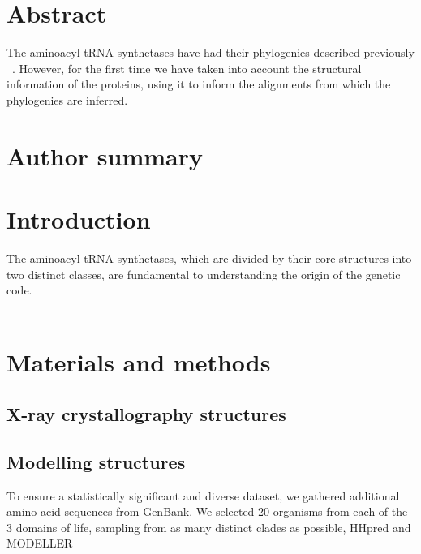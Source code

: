 \documentclass[10pt,letterpaper]{article}
\begin{document}
\section*{Abstract}
The aminoacyl-tRNA synthetases have had their phylogenies described previously ~\cite{bib1}.  However, for the first time we have taken into account the structural information of the proteins, using it to inform the alignments from which the phylogenies are inferred.

\section*{Author summary}

\linenumbers

\section*{Introduction}
The aminoacyl-tRNA synthetases, which are divided by their core structures into two distinct classes, are fundamental to understanding the origin of the genetic code.

\begin{eqnarray}
\label{eq:schemeP}
\end{eqnarray}

\section*{Materials and methods}
\subsection*{X-ray crystallography structures}



\subsection*{Modelling structures}
To ensure a statistically significant and diverse dataset, we gathered additional amino acid sequences from GenBank.  We selected 20 organisms from each of the 3 domains of life, sampling from as many distinct clades as possible, HHpred and MODELLER
\end{document}
